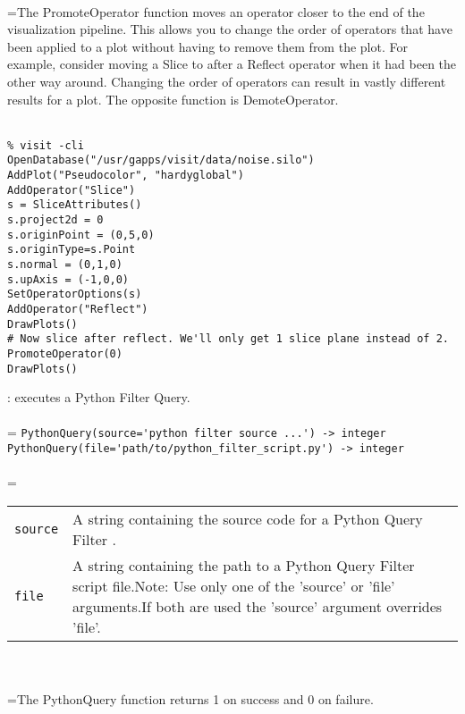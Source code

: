 \documentclass[10pt,a4paper]{report}
\begin{document}
 \\ 
\hangindent=\parindent The PromoteOperator function moves an operator closer to the end of the visualization pipeline. This allows you to change the order of operators that have been applied to a plot without having to remove them from the plot. For example, consider moving a Slice to after a Reflect operator when it had been the other way around. Changing the order of operators can result in vastly different results for a plot. The opposite function is DemoteOperator. \\[-3mm] 

\\[-6mm]
\begin{verbatim}% visit -cli
OpenDatabase("/usr/gapps/visit/data/noise.silo")
AddPlot("Pseudocolor", "hardyglobal")
AddOperator("Slice")
s = SliceAttributes()
s.project2d = 0
s.originPoint = (0,5,0)
s.originType=s.Point
s.normal = (0,1,0)
s.upAxis = (-1,0,0)
SetOperatorOptions(s)
AddOperator("Reflect")
DrawPlots()
# Now slice after reflect. We'll only get 1 slice plane instead of 2.
PromoteOperator(0)
DrawPlots()
\end{verbatim}
\newpage


{}
: executes a Python Filter Query.\\[-3mm]

 \\ 
\hangindent=\parindent 
\verb!PythonQuery(source='python filter source ...') -> integer!\\ 
\verb!PythonQuery(file='path/to/python_filter_script.py') -> integer!\\ [-3mm]

 \\ 
\hangindent=\parindent 
\begin{tabular}{lp{9cm}}
\verb!source! & A string containing the source code for a Python Query Filter . \\
\verb!file! & A string containing the path to a Python Query Filter script file.Note: Use only one of the 'source' or 'file' arguments.If both are used the 'source' argument overrides 'file'. \\
\end{tabular} \\[-2mm]


 \\ 
\hangindent=\parindent The PythonQuery function returns 1 on success and 0 on failure. \\[-3mm] 
\end{document}
